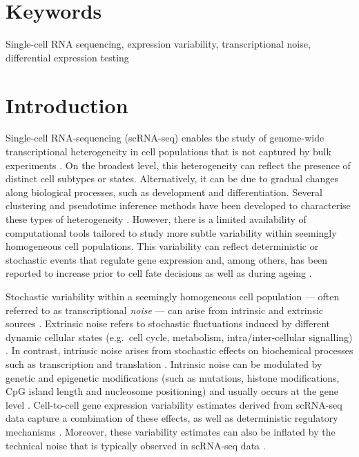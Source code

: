\documentclass[9pt,a4paper,]{extarticle}
\begin{document}
\section*{Keywords}
Single-cell RNA sequencing, expression variability, transcriptional noise, differential expression testing


\clearpage
\pagestyle{main}

\hypertarget{introduction}{%
\section{Introduction}\label{introduction}}

Single-cell RNA-sequencing (scRNA-seq) enables the study of genome-wide
transcriptional heterogeneity in cell populations that is not
captured by bulk experiments \citep{Stegle2015, Prakadan2017, Patange2018}.
On the broadest level, this heterogeneity can reflect the presence of distinct
cell subtypes or states.
Alternatively, it can be due to gradual changes along biological processes,
such as development and differentiation.
Several clustering and pseudotime inference methods have been developed to
characterise these types of heterogeneity \citep{Kiselev2019, Saelens2019}.
However, there is a limited availability of computational tools tailored
to study more subtle variability within seemingly homogeneous cell populations.
This variability can reflect deterministic or stochastic events that regulate
gene expression and, among others, has been reported to increase prior to cell
fate decisions \citep{Mojtahedi2016} as well as during ageing \citep{Martinez-jimenez2017}.

Stochastic variability within a seemingly homogeneous cell population --- often
referred to as transcriptional \emph{noise} --- can arise from intrinsic and
extrinsic sources \citep{Elowitz2002, Eling2019}.
Extrinsic noise refers to stochastic fluctuations induced by
different dynamic cellular states (e.g.~cell cycle, metabolism,
intra/inter-cellular signalling) \citep{Zopf2013, Iwamoto2016, Kiviet2014}.
In contrast, intrinsic noise arises from stochastic effects on biochemical
processes such as transcription and translation \citep{Elowitz2002}.
Intrinsic noise can be modulated by genetic and epigenetic modifications (such
as mutations, histone modifications, CpG island length and nucleosome
positioning) \citep{Eberwine2015, Faure2017, Morgan2018} and usually occurs
at the gene level \citep{Elowitz2002}.
Cell-to-cell gene expression variability estimates derived from scRNA-seq data
capture a combination of these effects, as well as deterministic regulatory
mechanisms \citep{Eling2019}.
Moreover, these variability estimates can also be inflated by the technical
noise that is typically observed in scRNA-seq data \citep{Brennecke2013}.
\end{document}

